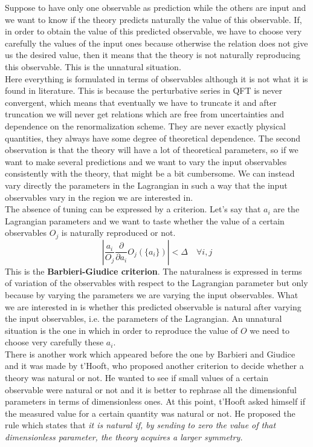 \documentclass[../main.tex]{subfiles}
\begin{document}
Suppose to have only one observable as prediction while the others are input and we want to know if the theory predicts naturally the value of this observable. If, in order to obtain the value of this predicted observable, we have to choose very carefully the values of the input ones because otherwise the relation does not give us the desired value, then it means that the theory is not naturally reproducing this observable. This is the unnatural situation.\\
Here everything is formulated in terms of observables although it is not what it is found in literature. This is because the perturbative series in QFT is never convergent, which means that eventually we have to truncate it and after truncation we will never get relations which are free from uncertainties and dependence on the renormalization scheme. They are never exactly physical quantities, they always have some degree of theoretical dependence. The second observation is that the theory will have a lot of theoretical parameters, so if we want to make several predictions and we want to vary the input observables consistently with the theory, that might be a bit cumbersome. We can instead vary directly the parameters in the Lagrangian in such a way that the input observables vary in the region we are interested in.\\
The absence of tuning can be expressed by a criterion. Let's say that $a_i$ are the Lagrangian parameters and we want to taste whether the value of a certain observables $O_j$ is naturally reproduced or not. 
\[
\left|\frac{a_i}{O_j}\frac{\partial}{\partial a_i}O_j(\{a_i\})\right|<\Delta \quad \forall i,j
\]
This is the \textbf{Barbieri-Giudice criterion}. The naturalness is expressed in terms of variation of the observables with respect to the Lagrangian parameter but only because by varying the parameters we are varying the input observables. What we are interested in is whether this predicted observable is natural after varying the input observables, i.e. the parameters of the Lagrangian. An unnatural situation is the one in which in order to reproduce the value of $O$ we need to choose very carefully these $a_i$.\\
There is another work which appeared before the one by Barbieri and Giudice and it was made by t'Hooft, who proposed another criterion to decide whether a theory was natural or not. He wanted to see if small values of a certain observable were natural or not and it is better to rephrase all the dimensionful parameters in terms of dimensionless ones. At this point, t'Hooft asked himself if the measured value for a certain quantity was natural or not. He proposed the rule which states that \textit{it is natural if, by sending to zero the value of that dimensionless parameter, the theory acquires a larger symmetry.}
\end{document}
